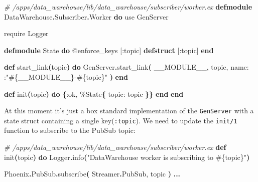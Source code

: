 \documentclass[
  oneside]{book}
\newenvironment{Shaded}{\begin{snugshade}}{\end{snugshade}}
\newcommand{\CommentTok}[1]{\textcolor[rgb]{0.56,0.35,0.01}{\textit{#1}}}
\newcommand{\ConstantTok}[1]{\textcolor[rgb]{0.56,0.35,0.01}{#1}}
\newcommand{\FunctionTok}[1]{\textcolor[rgb]{0.13,0.29,0.53}{\textbf{#1}}}
\newcommand{\ImportTok}[1]{#1}
\newcommand{\KeywordTok}[1]{\textcolor[rgb]{0.13,0.29,0.53}{\textbf{#1}}}
\newcommand{\NormalTok}[1]{#1}
\newcommand{\OperatorTok}[1]{\textcolor[rgb]{0.81,0.36,0.00}{\textbf{#1}}}
\newcommand{\OtherTok}[1]{\textcolor[rgb]{0.56,0.35,0.01}{#1}}
\newcommand{\StringTok}[1]{\textcolor[rgb]{0.31,0.60,0.02}{#1}}
\newcommand{\VariableTok}[1]{\textcolor[rgb]{0.00,0.00,0.00}{#1}}
\begin{document}
\begin{Shaded}
\begin{Highlighting}[]
\CommentTok{\# /apps/data\_warehouse/lib/data\_warehouse/subscriber/worker.ex}
\KeywordTok{defmodule} \ConstantTok{DataWarehouse}\OperatorTok{.}\ConstantTok{Subscriber}\OperatorTok{.}\ConstantTok{Worker} \KeywordTok{do}
  \ImportTok{use} \ConstantTok{GenServer}

  \ImportTok{require} \ConstantTok{Logger}

  \KeywordTok{defmodule} \ConstantTok{State} \KeywordTok{do}
    \OtherTok{@enforce\_keys} \OtherTok{[}\VariableTok{:topic}\OtherTok{]}
    \KeywordTok{defstruct} \OtherTok{[}\VariableTok{:topic}\OtherTok{]}
  \KeywordTok{end}

  \KeywordTok{def}\NormalTok{ start\_link}\FunctionTok{(}\NormalTok{topic}\FunctionTok{)} \KeywordTok{do}
    \ConstantTok{GenServer}\OperatorTok{.}\NormalTok{start\_link}\FunctionTok{(}
      \ConstantTok{\_\_MODULE\_\_}\NormalTok{,}
\NormalTok{      topic,}
      \VariableTok{name:}\NormalTok{ :}\StringTok{"}\OtherTok{\#\{}\ConstantTok{\_\_MODULE\_\_}\OtherTok{\}}\StringTok{{-}}\OtherTok{\#\{}\NormalTok{topic}\OtherTok{\}}\StringTok{"}
    \FunctionTok{)}
  \KeywordTok{end}

  \KeywordTok{def}\NormalTok{ init}\FunctionTok{(}\NormalTok{topic}\FunctionTok{)} \KeywordTok{do}
    \FunctionTok{\{}\VariableTok{:ok}\NormalTok{,}
\NormalTok{     \%}\ConstantTok{State}\FunctionTok{\{}
       \VariableTok{topic:}\NormalTok{ topic}
     \FunctionTok{\}\}}
  \KeywordTok{end}
\KeywordTok{end}
\end{Highlighting}
\end{Shaded}

At this moment it's just a box standard implementation of the \texttt{GenServer} with a state struct containing a single key(\texttt{:topic}). We need to update the \texttt{init/1} function to subscribe to the PubSub topic:

\begin{Shaded}
\begin{Highlighting}[]
\CommentTok{\# /apps/data\_warehouse/lib/data\_warehouse/subscriber/worker.ex}
  \KeywordTok{def}\NormalTok{ init}\FunctionTok{(}\NormalTok{topic}\FunctionTok{)} \KeywordTok{do}
    \ConstantTok{Logger}\OperatorTok{.}\NormalTok{info}\FunctionTok{(}\StringTok{"DataWarehouse worker is subscribing to }\OtherTok{\#\{}\NormalTok{topic}\OtherTok{\}}\StringTok{"}\FunctionTok{)}

    \ConstantTok{Phoenix}\OperatorTok{.}\ConstantTok{PubSub}\OperatorTok{.}\NormalTok{subscribe}\FunctionTok{(}
      \ConstantTok{Streamer}\OperatorTok{.}\ConstantTok{PubSub}\NormalTok{,}
\NormalTok{      topic}
    \FunctionTok{)}
    \OperatorTok{...}
\end{Highlighting}
\end{Shaded}
\end{document}
